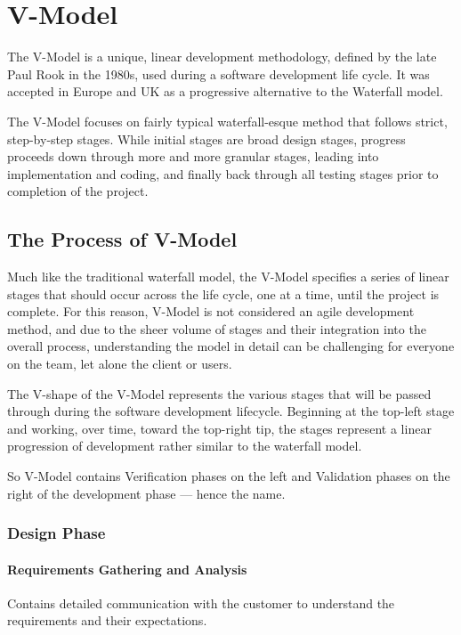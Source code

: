 \documentclass[main.tex]{subfiles}
\begin{document}
\section{V-Model}

The V-Model is a unique, linear development methodology, defined by the late Paul Rook in the 1980s, used during a software development life cycle.
It was accepted in Europe and UK as a progressive alternative to the Waterfall model.

The V-Model focuses on fairly typical waterfall-esque method that follows strict, step-by-step stages. While initial stages are broad design stages, progress proceeds down through more and more granular stages, leading into implementation and coding, and finally back through all testing stages prior to completion of the project.

\subsection{The Process of V-Model}

Much like the traditional waterfall model, the V-Model specifies a series of linear stages that should occur across the life cycle, one at a time, until the project is complete.
For this reason, V-Model is not considered an agile development method, and due to the sheer volume of stages and their integration into the overall process, understanding the model in detail can be challenging for everyone on the team, let alone the client or users.

The V-shape of the V-Model represents the various stages that will be passed through during the software development lifecycle.
Beginning at the top-left stage and working, over time, toward the top-right tip, the stages represent a linear progression of development rather similar to the waterfall model.

So V-Model contains Verification phases on the left and Validation phases on the right of the development phase --- hence the name.

\subsubsection{Design Phase}

\paragraph{Requirements Gathering and Analysis}
Contains detailed communication with the customer to understand the requirements and their expectations.
\end{document}
